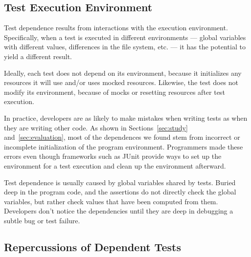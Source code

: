 \subsection{Test Execution Environment}

Test dependence results from interactions with the execution environment.
Specifically, when a
test is executed in different environments --- global variables
with different values, differences in the file system, etc. --- it has the
potential to yield
a different result.  

Ideally, each test does not depend on its environment, because it
initializes any resources it will use and/or uses mocked resources.
Likewise, the test does not modify its environment, because of mocks or
resetting resources after test execution.

In practice, developers are as likely
to make mistakes when writing tests as when they are writing other code.
As shown in Sections~\ref{sec:study} and~\ref{sec:evaluation}, most of the dependences we found
stem from incorrect or incomplete initialization
of the program environment.
Programmers made these errors even though frameworks such as
JUnit provide ways to set up the environment for a test execution and clean
up the environment afterward.



Test dependence is usually caused by
global variables shared by tests.
Buried deep in the program code, and the assertions
do not directly check the global variables,
but rather check values that have been computed from
them.
Developers don't notice the dependencies until they are deep in debugging a
subtle bug or test failure.


\subsection{Repercussions of Dependent Tests}


